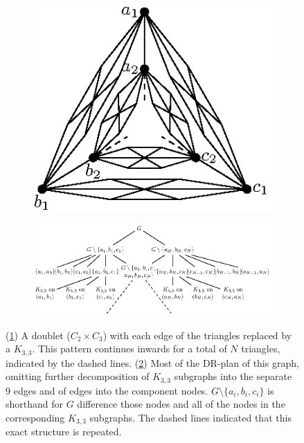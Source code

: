 \begin{figure}\centering%
    \begin{subfigure}{0.3\linewidth}\centering
        \includegraphics[height=\myMinHeight]{img/epsfromtikz/c2c3_of_k33s-0}
        \caption{}\label{fig:c2c3ofk33s:a}
    \end{subfigure}%
    \hfill
    \begin{subfigure}{0.7\linewidth}\centering
        \includegraphics[height=\myMinHeight]{img/epsfromtikz/c2c3_of_k33s-1}
        \caption{}\label{fig:c2c3ofk33s:b}
    \end{subfigure}%
    \caption{(\ref{fig:c2c3ofk33s:a}) A doublet ($C_2 \times C_3$) with each edge of the triangles replaced by a $K_{3,3}$. This pattern continues inwards for a total of $N$ triangles, indicated by the dashed lines. (\ref{fig:c2c3ofk33s:b}) Most of the DR-plan of this graph, omitting further decomposition of $K_{3,3}$ subgraphs into the separate 9 edges and of edges into the component nodes. $G\setminus\{a_i,b_i,c_i\}$ is shorthand for $G$ difference those nodes and all of the nodes in the corresponding $K_{3,3}$ subgraphs. The dashed lines indicated that this exact structure is repeated.}
    \label{fig:c2c3ofk33s}
\end{figure}%




